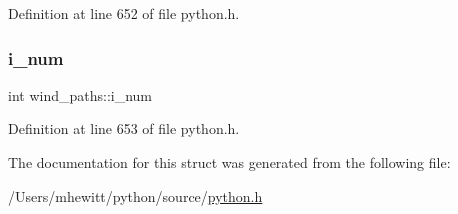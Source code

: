 Definition at line 652 of file python.\+h.

\mbox{\label{structwind__paths_adbd726e6d16ac18e5293af5aab92be0e}} 
\subsubsection{\texorpdfstring{i\+\_\+num}{i\_num}}
{\footnotesize\ttfamily int wind\+\_\+paths\+::i\+\_\+num}



Definition at line 653 of file python.\+h.



The documentation for this struct was generated from the following file\+:\begin{DoxyCompactItemize}
\item 
/\+Users/mhewitt/python/source/\hyperlink{python_8h}{python.\+h}\end{DoxyCompactItemize}
